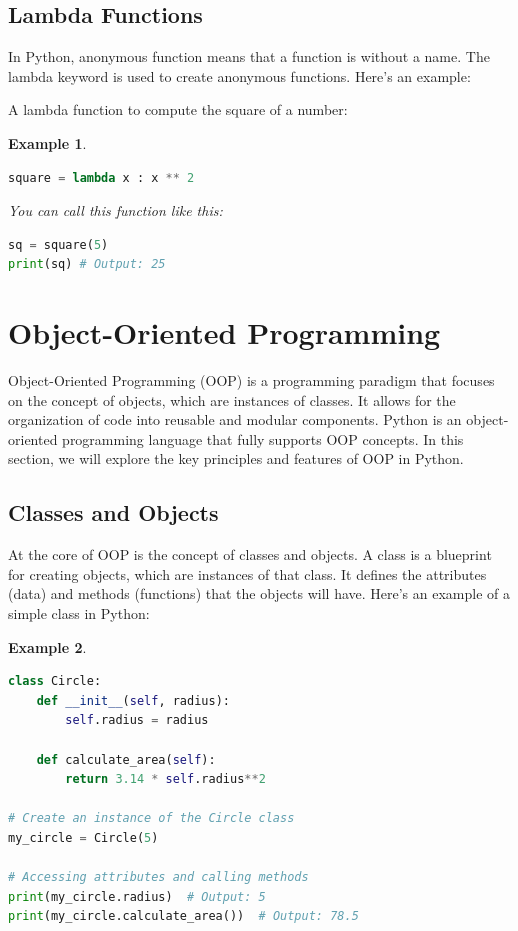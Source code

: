 \documentclass[12pt]{article}
\newtheorem{Example}{Example}[section]
\begin{document}
\subsection{Lambda Functions}
In Python, anonymous function means that a function is without a name. The lambda keyword is used to create anonymous functions. Here's an example:


A lambda function to compute the square of a number:
\begin{Example}
\begin{lstlisting}[language=Python]
square = lambda x : x ** 2
\end{lstlisting}
You can call this function like this:
\begin{lstlisting}[language=Python]
sq = square(5)
print(sq) # Output: 25
\end{lstlisting}
\end{Example}


\newpage
\section{Object-Oriented Programming}
Object-Oriented Programming (OOP) is a programming paradigm that focuses on the concept of objects, which are instances of classes. It allows for the organization of code into reusable and modular components. Python is an object-oriented programming language that fully supports OOP concepts. In this section, we will explore the key principles and features of OOP in Python.

\subsection{Classes and Objects}

At the core of OOP is the concept of classes and objects. A class is a blueprint for creating objects, which are instances of that class. It defines the attributes (data) and methods (functions) that the objects will have. Here's an example of a simple class in Python:

\begin{Example}
\begin{lstlisting}[language=Python]
class Circle:
    def __init__(self, radius):
        self.radius = radius

    def calculate_area(self):
        return 3.14 * self.radius**2

# Create an instance of the Circle class
my_circle = Circle(5)

# Accessing attributes and calling methods
print(my_circle.radius)  # Output: 5
print(my_circle.calculate_area())  # Output: 78.5
\end{lstlisting}
\end{Example}
\end{document}
